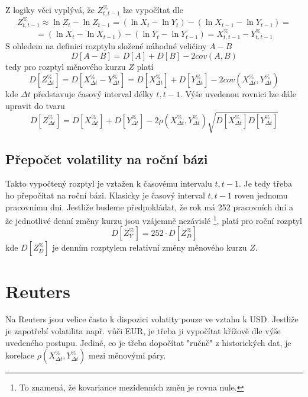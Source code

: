 \documentclass[a4paper]{book}
\begin{document}
Z logiky věci vyplývá, že $Z^{\%}_{t, t-1}$ lze vypočítat dle
\begin{equation*}
Z^{\%}_{t, t-1} \approx \ln Z_t - \ln Z_{t-1} = (\ln X_t - \ln Y_t) - (\ln X_{t-1} -  \ln Y_{t-1}) =
\end{equation*}
\begin{equation*}
= (\ln X_t - \ln X_{t-1}) - (\ln Y_t - \ln Y_{t-1}) = X^{\%}_{t, t-1} - Y^{\%}_{t, t-1} 
\end{equation*}
S ohledem na definici rozptylu složené náhodné veličiny $A - B$
\begin{equation*}
D[A - B] = D[A] + D[B] - 2cov(A,B)
\end{equation*}
tedy pro rozptyl měnového kurzu $Z$ platí
\begin{equation*}
D[Z^{\%}_{\Delta t}] = D[X^{\%}_{\Delta t} - Y^{\%}_{\Delta t}] = D[X^{\%}_{\Delta t}] + D[Y^{\%}_{\Delta t}] - 2 cov(X^{\%}_{\Delta t}, Y^{\%}_{\Delta t})
\end{equation*}
kde $\Delta t$ představuje časový interval délky $t, t-1$. Výše uvedenou rovnici lze dále upravit do tvaru
\begin{equation*}
D[Z^{\%}_{\Delta t}] = D[X^{\%}_{\Delta t}] + D[Y^{\%}_{\Delta t}] - 2 \rho(X^{\%}_{\Delta t}, Y^{\%}_{\Delta t}) \sqrt{D[X^{\%}_{\Delta t}]D[Y^{\%}_{\Delta t}]}
\end{equation*}

\subsection{Přepočet volatility na roční bázi}

Takto vypočtený rozptyl je vztažen k časovému intervalu $t, t-1$. Je tedy třeba ho přepočítat na roční bázi. Klasicky je časový interval $t, t-1$ roven jednomu pracovnímu dni. Jestliže budeme předpokládat, že rok má 252 pracovních dní a že jednotlivé denní změny kurzu jsou vzájemně nezávislé \footnote{To znamená, že kovariance mezidenních změn je rovna nule.}, platí pro roční rozptyl
\begin{equation*}
D[Z^{\%}_Y] = 252 \cdot D[Z^{\%}_D]
\end{equation*}
kde $D[Z^{\%}_D]$ je denním rozptylem relativní změny měnového kurzu $Z$.

\section{Reuters}

Na Reuters jsou velice často k dispozici volatity pouze ve vztahu k USD. Jestliže je zapotřebí volatilita např. vůči EUR, je třeba ji vypočítat křížově dle výše uvedeného postupu. Jediné, co je třeba dopočítat "ručně" z historických dat, je korelace $\rho(X^{\%}_{\Delta t}, Y^{\%}_{\Delta t})$ mezi měnovými páry.
\end{document}
